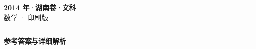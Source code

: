 \documentclass[zihao=5, a4paper]{ctexart}
\begin{document}
\begin{center}
  {\Large\bfseries 2014 年·湖南卷·文科}\\[4pt]
  {\large 数学 · 印刷版}
\end{center}
\medskip
{}

\par\bigskip\hrule\bigskip
{}
\Needspace{0.55\textheight}
\begin{center}{\large\bfseries 参考答案与详细解析}\end{center}
\smallskip

\end{document}
